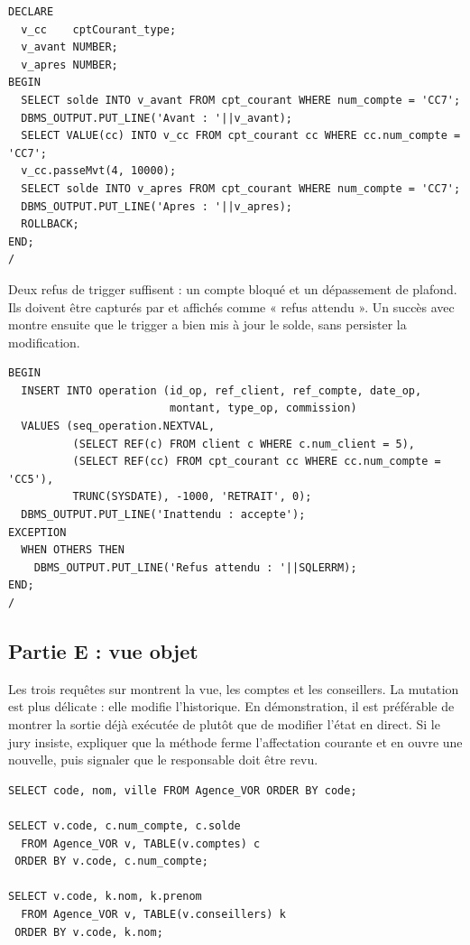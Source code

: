 \begin{lstlisting}[caption={\code{passeMvt} avec rollback.},label={lst:demo-passeMvt}]
DECLARE
  v_cc    cptCourant_type;
  v_avant NUMBER;
  v_apres NUMBER;
BEGIN
  SELECT solde INTO v_avant FROM cpt_courant WHERE num_compte = 'CC7';
  DBMS_OUTPUT.PUT_LINE('Avant : '||v_avant);
  SELECT VALUE(cc) INTO v_cc FROM cpt_courant cc WHERE cc.num_compte = 'CC7';
  v_cc.passeMvt(4, 10000);
  SELECT solde INTO v_apres FROM cpt_courant WHERE num_compte = 'CC7';
  DBMS_OUTPUT.PUT_LINE('Apres : '||v_apres);
  ROLLBACK;
END;
/
\end{lstlisting}

Deux refus de trigger suffisent : un compte bloqué et un dépassement de
plafond. Ils doivent être capturés par  et affichés
comme « refus attendu ». Un succès avec  montre ensuite que le
trigger  a bien mis à jour le solde, sans persister la modification.

\begin{lstlisting}[caption={Refus d'une opération sur un compte bloqué.},label={lst:demo-refus}]
BEGIN
  INSERT INTO operation (id_op, ref_client, ref_compte, date_op,
                         montant, type_op, commission)
  VALUES (seq_operation.NEXTVAL,
          (SELECT REF(c) FROM client c WHERE c.num_client = 5),
          (SELECT REF(cc) FROM cpt_courant cc WHERE cc.num_compte = 'CC5'),
          TRUNC(SYSDATE), -1000, 'RETRAIT', 0);
  DBMS_OUTPUT.PUT_LINE('Inattendu : accepte');
EXCEPTION
  WHEN OTHERS THEN
    DBMS_OUTPUT.PUT_LINE('Refus attendu : '||SQLERRM);
END;
/
\end{lstlisting}

\subsection{Partie E : vue objet}

Les trois requêtes sur  montrent la vue, les comptes et les
conseillers. La mutation est plus délicate : elle modifie l'historique. En
démonstration, il est préférable de montrer la sortie déjà exécutée de
 plutôt que de modifier l'état en direct. Si le jury insiste,
expliquer que la méthode ferme l'affectation courante et en ouvre une nouvelle,
puis signaler que le responsable doit être revu.

\begin{lstlisting}[caption={Interrogation de la vue objet.},label={lst:demo-e}]
SELECT code, nom, ville FROM Agence_VOR ORDER BY code;

SELECT v.code, c.num_compte, c.solde
  FROM Agence_VOR v, TABLE(v.comptes) c
 ORDER BY v.code, c.num_compte;

SELECT v.code, k.nom, k.prenom
  FROM Agence_VOR v, TABLE(v.conseillers) k
 ORDER BY v.code, k.nom;
\end{lstlisting}

